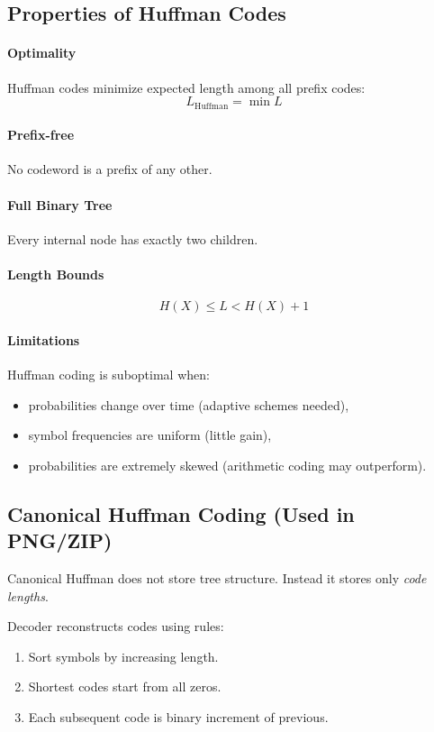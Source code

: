 \documentclass{AnantDocumentation}
\begin{document}
\subsection{Properties of Huffman Codes}

\paragraph{Optimality}
Huffman codes minimize expected length among all prefix codes:
\[
L_{\text{Huffman}} = \min L
\]

\paragraph{Prefix-free}
No codeword is a prefix of any other.

\paragraph{Full Binary Tree}
Every internal node has exactly two children.

\paragraph{Length Bounds}
\[
H(X) \le L < H(X) + 1
\]

\paragraph{Limitations}
Huffman coding is suboptimal when:
\begin{itemize}
\item probabilities change over time (adaptive schemes needed),
\item symbol frequencies are uniform (little gain),
\item probabilities are extremely skewed (arithmetic coding may outperform).
\end{itemize}

\subsection{Canonical Huffman Coding (Used in PNG/ZIP)}

Canonical Huffman does not store tree structure.  
Instead it stores only \emph{code lengths}.  

Decoder reconstructs codes using rules:
\begin{enumerate}
\item Sort symbols by increasing length.
\item Shortest codes start from all zeros.
\item Each subsequent code is binary increment of previous.
\end{enumerate}
\end{document}
